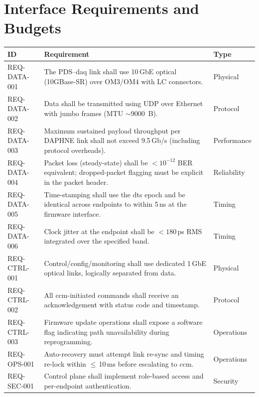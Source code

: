 
\section{Interface Requirements and Budgets}
\label{sec:reqs}
\renewcommand{\arraystretch}{1.16}
\begin{longtable}{@{}p{2.1cm}p{9.5cm}p{2.2cm}@{}}
\toprule
\textbf{ID} & \textbf{Requirement} & \textbf{Type} \\\midrule
REQ-DATA-001 & The PDS--\gls{daq} link shall use 10\,GbE optical (10GBase-SR) over OM3/OM4 with LC connectors. & Physical \\
REQ-DATA-002 & Data shall be transmitted using UDP over Ethernet with jumbo frames (MTU $\sim$9000~B). & Protocol \\
REQ-DATA-003 & Maximum sustained payload throughput per DAPHNE link shall not exceed 9.5\,Gb/s (including protocol overheads). & Performance \\
REQ-DATA-004 & Packet loss (steady-state) shall be $<10^{-12}$ BER equivalent; dropped-packet flagging must be explicit in the packet header. & Reliability \\
REQ-DATA-005 & Time-stamping shall use the \gls{dts} epoch and be identical across endpoints to within 5\,ns at the firmware interface. & Timing \\
REQ-DATA-006 & Clock jitter at the endpoint shall be $<180$\,ps RMS integrated over the specified band. & Timing \\
REQ-CTRL-001 & Control/config/monitoring shall use dedicated 1\,GbE optical links, logically separated from data. & Physical \\
REQ-CTRL-002 & All \gls{ccm}-initiated commands shall receive an acknowledgement with status code and timestamp. & Protocol \\
REQ-CTRL-003 & Firmware update operations shall expose a software flag indicating path unavailability during reprogramming. & Operations \\
REQ-OPS-001 & Auto-recovery must attempt link re-sync and timing re-lock within $\le$\,10\,ms before escalating to \gls{ccm}. & Operations \\
REQ-SEC-001 & Control plane shall implement role-based access and per-endpoint authentication. & Security \\
\bottomrule
\end{longtable}

